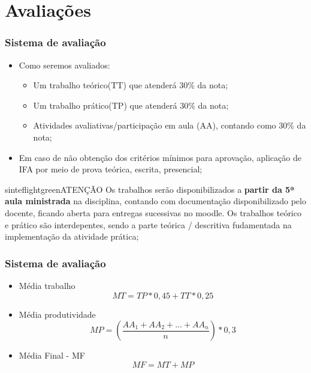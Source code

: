 \documentclass{beamer}
\begin{document}
\section{Avaliações}

\begin{frame}[fragile]\justifying
\frametitle{Sistema de avaliação}
\begin{itemize}
            
            \item Como seremos avaliados:
            \begin{itemize}
                  \item Um trabalho teórico(TT) que atenderá 30\% da nota;
                  \item Um trabalho prático(TP) que atenderá 30\% da nota;
                  \item Atividades avaliativas/participação em aula (AA), contando como 30\% da nota;
            \end{itemize}
            \item Em caso de não obtenção dos critérios mínimos para aprovação, aplicação de IFA por meio de prova teórica, escrita, presencial;
\end{itemize}
\begin{colorblock}[black]{sinteflightgreen}{ATENÇÃO}
      Os trabalhos serão disponibilizados a \textbf{partir da 5ª aula ministrada} na disciplina, contando com documentação disponibilizado pelo docente, ficando aberta para entregas sucessivas no moodle.
      Os trabalhos teórico e prático são interdepentes, sendo a parte teórica / descritiva fudamentada na implementação da atividade prática;
\end{colorblock}

\end{frame}

\begin{frame}[fragile]\justifying
      \frametitle{Sistema de avaliação}
      \begin{itemize}
            \item Média trabalho \[ MT = TP * 0,45 + TT * 0,25\]
            \item Média produtividade \[ MP = \left ( \frac{AA_1 + AA_2 + ... + AA_n}n \right ) * 0,3 \]
            \item Média Final - MF \[MF = MT + MP\]
      \end{itemize}
      
      \end{frame}
\end{document}

